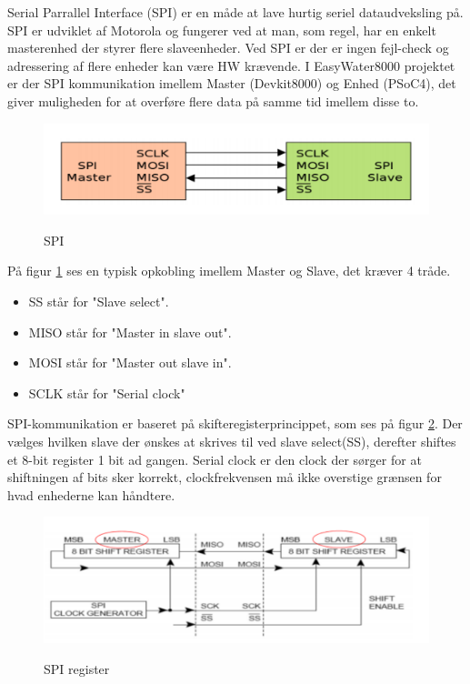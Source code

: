 Serial Parrallel Interface (SPI) er en måde at lave hurtig seriel dataudveksling på. SPI er udviklet af Motorola og fungerer ved at man, som regel, har en enkelt masterenhed der styrer flere slaveenheder. Ved SPI er der er ingen fejl-check og adressering af flere enheder kan være HW krævende. I EasyWater8000 projektet er der SPI kommunikation imellem Master (Devkit8000)
og Enhed (PSoC4), det giver muligheden for at overføre flere data på samme tid imellem disse to.

\begin{figure}[H] \centering
{\includegraphics[width=\textwidth]{filer/design/Billeder/SPI_MASTER_SLAVE}}
\caption{SPI}
\label{lab:SPI}
\raggedright
\end{figure}

På figur \ref{lab:SPI} ses en typisk opkobling imellem Master og Slave, det kræver 4 tråde.
\begin{itemize}
 	\item SS står for "Slave select".
 	\item MISO står for "Master in slave out".
 	\item MOSI står for "Master out slave in". 
	\item SCLK står for "Serial clock" 
\end{itemize}

SPI-kommunikation er baseret på skifteregisterprincippet, som ses på figur \ref{lab:SPI_REGISTER}. Der vælges hvilken slave der 
ønskes at skrives til ved slave select(SS), derefter shiftes et 8-bit register 1 bit ad gangen. Serial clock er den clock der sørger for at
shiftningen af bits sker korrekt, clockfrekvensen må ikke overstige grænsen for hvad enhederne kan håndtere.

\begin{figure}[H] \centering
{\includegraphics[width=\textwidth]{filer/design/Billeder/SPI_REGISTER}}
\caption{SPI register}
\label{lab:SPI_REGISTER}
\raggedright
\end{figure}  

